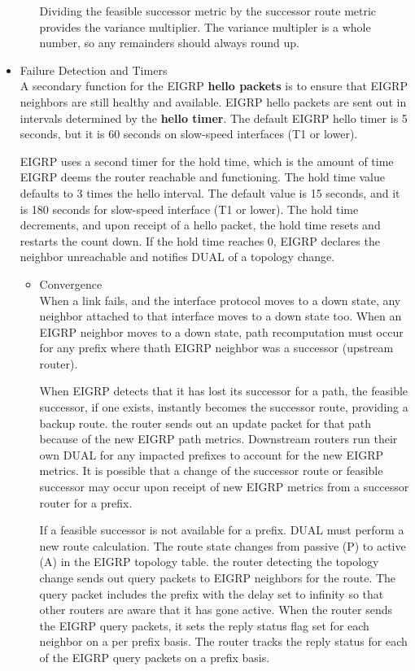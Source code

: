 \documentclass{article}
\begin{document}
\begin{itemize}
\begin{itemize}
				Dividing the feasible successor metric by the successor route metric provides the variance multiplier. The variance multipler is a whole number, so any remainders should always round up.
		\end{itemize}


	\item Failure Detection and Timers\\
		A secondary function for the EIGRP \textbf{hello packets} is to ensure that EIGRP neighbors are still healthy and available. EIGRP hello packets are sent out in intervals determined by the \textbf{hello timer}. The default EIGRP hello timer is 5 seconds, but it is 60 seconds on slow-speed interfaces (T1 or lower).

		EIGRP uses a second timer for the hold time, which is the amount of time EIGRP deems the router reachable and functioning. The hold time value defaults to 3 times the hello interval. The default value is 15 seconds, and it is 180 seconds for slow-speed interface (T1 or lower). The hold time decrements, and upon receipt of a hello packet, the hold time resets and restarts the count down. If the hold time reaches 0, EIGRP declares the neighbor unreachable and notifies DUAL of a topology change.

		\begin{itemize}
			\item Convergence\\
				When a link fails, and the interface protocol moves to a down state, any neighbor attached to that interface moves to a down state too. When an EIGRP neighbor moves to a down state, path recomputation must occur for any prefix where thath EIGRP neighbor was a successor (upstream router).

				When EIGRP detects that it has lost its successor for a path, the feasible successor, if one exists, instantly becomes the successor route, providing a backup route. the router sends out an update packet for that path because of the new EIGRP path metrics. Downstream routers run their own DUAL for any impacted prefixes to account for the new EIGRP metrics. It is possible that a change of the successor route or feasible successor may occur upon receipt of new EIGRP metrics from a successor router for a prefix.

				If a feasible successor is not available for a prefix. DUAL must perform a new route calculation. The route state changes from passive (P) to active (A) in the EIGRP topology table. the router detecting the topology change sends out query packets to EIGRP neighbors for the route. The query packet includes the prefix with the delay set to infinity so that other routers are aware that it has gone active. When the router sends the EIGRP query packets, it sets the reply status flag set for each neighbor on a per prefix basis. The router tracks the reply status for each of the EIGRP query packets on a prefix basis.


\end{itemize}
\end{itemize}
\end{document}
